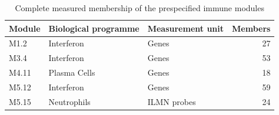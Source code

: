 \begin{table}[t]
\caption{Complete measured membership of the prespecified immune modules}\label{tab:immune-modules}
\begin{tabularx}{\textwidth}{@{}lXlr@{}}
\toprule
Module & Biological programme & Measurement unit & Members \\
\midrule
M1.2 & Interferon & Genes & 27 \\
M3.4 & Interferon & Genes & 53 \\
M4.11 & Plasma Cells & Genes & 18 \\
M5.12 & Interferon & Genes & 59 \\
M5.15 & Neutrophils & ILMN probes & 24 \\
\bottomrule
\end{tabularx}
\end{table}
